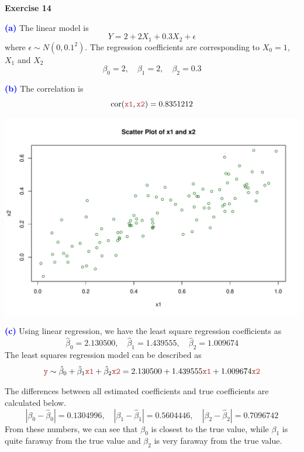 \documentclass[a4paper,12pt]{article}
\newcommand{\code}[1]{\texttt{#1}}
\newcommand{\qnum}[1]{\noindent\textcolor{blue}{\textbf{(#1)}}}
\begin{document}
\bigskip\bigskip
\begin{center}
    \textcolor{myfirebrick}{\textbf{Exercise 14}}
\end{center}

\newcommand{\xar}{\textcolor{myfirebrick}{\code{x1}} }
\newcommand{\xbr}{\textcolor{myfirebrick}{\code{x2}} }

\qnum{a}
The linear model is 
\[
    Y = 2 + 2X_1 + 0.3X_2 + \epsilon 
\]
where $\epsilon\sim N(0, 0.1^2)$. The regression coefficients are corresponding to $X_0 = 1$, $X_1$ and $X_2$
\[
    \beta_0 = 2,\quad 
    \beta_1 = 2,\quad 
    \beta_2 = 0.3
\]


\qnum{b}
The correlation is 
\[
    \text{cor}(\xar, \xbr) = 0.8351212
\]

\begin{center}
    \includegraphics[width=0.9\linewidth]{Images/Prob2-Ex14-b.pdf}
\end{center}
\bigskip


\qnum{c}
Using linear regression, we have the least square regression coefficients as 
\[
    \hat\beta_0 = 2.130500,\quad 
    \hat\beta_1 = 1.439555,\quad 
    \hat\beta_2 = 1.009674
\]
The least squares regression model can be described as 
\[
    \yr \sim\hat\beta_0 + \hat\beta_1\xar + \hat\beta_2\xbr
    = 2.130500 + 
    1.439555\xar +
    1.009674\xbr 
\]

The differences between all estimated coefficients and true coefficients are calculated below.
\[
    |\beta_0 - \hat\beta_0| = 0.1304996,\quad 
    |\beta_1 - \hat\beta_1| = 0.5604446,\quad 
    |\beta_2 - \hat\beta_2| = 0.7096742
\]
From these numbers, we can see that $\beta_0$ is closest to the true value, while $\beta_1$ is quite faraway from the true value and $\beta_2$ is very faraway from the true value.
\end{document}
